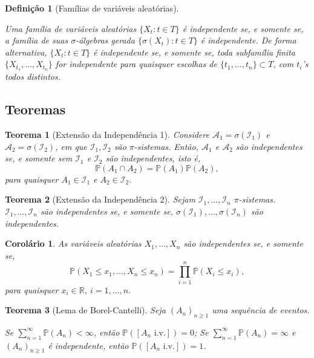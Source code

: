 \documentclass[12pt,a4paper,answers]{article}
\numberwithin{equation}{section} %
\renewcommand{\Re}{\mathbb{R}}
\renewcommand{\P}{\mathbb{P}}
\newcommand{\Acal}{\mathcal{A}}
\newcommand{\Ical}{\mathcal{I}}
\theoremstyle{thm_estilo}
\newtheorem{theorem}{Teorema}[section]
\newtheorem{definition}{Definição}[section]
\newtheorem{corollary}{Corolário}[section]
\theoremstyle{thm_note_est}
\begin{document}
\begin{definition}[Famílias de variáveis aleatórias]
	\leavevmode
	\begin{outline}
		\1 Uma família de variáveis aleatórias $\{X_t: t \in T\}$ é independente se, e somente se, a família de suas $\sigma$-álgebras gerada $\{\sigma(X_t): t \in T\}$ é independente.
		\1 De forma alternativa,  $\{X_t: t \in T\}$ é independente se, e somente se, toda subfamília finita $\{X_{t_1}, \ldots, X_{t_n}\}$ for independente para quaisquer escolhas de $\{t_1, \ldots, t_n\}\subset T$, com $t_i$'s todos distintos.
	\end{outline}
\end{definition}

\subsection{Teoremas}

\begin{theorem}[Extensão da Independência 1]
	Considere $\Acal_1 = \sigma(\Ical_1)$ e $\Acal_2 = \sigma(\Ical_2)$, em que $\Ical_1, \Ical_2$ são $\pi$-sistemas. Então, $\Acal_1$ e $\Acal_2$ são independentes se, e somente sem $\Ical_1$ e $\Ical_2$ são independentes, isto é, 
	\begin{equation}
		\P(A_1\cap A_2) = \P(A_1) \P(A_2),
	\end{equation}
	para quaisquer $A_1\in\Ical_1$ e $A_2\in\Ical_2$.
\end{theorem}

\begin{theorem}[Extensão da Independência 2]
	Sejam $\Ical_1, \ldots, \Ical_n$ $\pi$-sistemas. $\Ical_1, \ldots, \Ical_n$ são independentes se, e somente se, $\sigma(\Ical_1), \ldots, \sigma(\Ical_n)$ são independentes.
\end{theorem}

\begin{corollary}
	As variáveis aleatórias $X_1,\ldots, X_n$ são independentes se, e somente se,
	\begin{equation}
		\P(X_1\leq x_1, \ldots, X_n\leq x_n) = \prod_{i=1}^{n}\P(X_i\leq x_i),
	\end{equation}
	para quaisquer $x_i \in \Re, \ i=1,\ldots,n$.
\end{corollary}

\begin{theorem}[Lema de Borel-Cantelli]
	Seja $(A_n)_{n\geq1}$ uma sequência de eventos.
	\begin{outline}[enumerate]
		\1 Se $\sum_{n=1}^{\infty}\P(A_n) < \infty$, então $\P([A_n \text{ i.v.}])=0$;
		\1 Se $\sum_{n=1}^{\infty}\P(A_n) = \infty$ e $(A_n)_{n\geq1}$ é independente, então $\P([A_n \text{ i.v.}])=1$.
	\end{outline}
\end{theorem}
\end{document}
